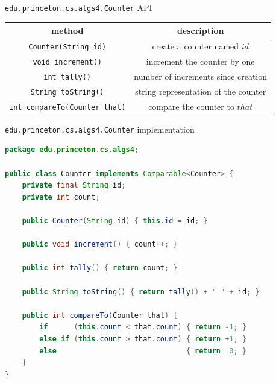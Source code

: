 \documentclass[8pt,a4paper,compress]{beamer}
\begin{document}
\begin{frame}[fragile]
\pause

\lstinline{edu.princeton.cs.algs4.Counter} API
\begin{center}
\begin{tabular}{cc}
method & description \\ \hline
\lstinline$Counter(String id)$ & create a counter named $id$ \\
\lstinline$void increment()$ & increment the counter by one \\
\lstinline$int tally()$ & number of increments since creation \\
\lstinline$String toString()$ & string representation of the counter \\
\lstinline$int compareTo(Counter that)$ & compare the counter to $that$
\end{tabular} 
\end{center}

\pause

\lstinline{edu.princeton.cs.algs4.Counter} implementation

\smallskip

\begin{lstlisting}[language=Java,style=focusin]
package edu.princeton.cs.algs4;

public class Counter implements Comparable<Counter> {
    private final String id;
    private int count;

    public Counter(String id) { this.id = id; }

    public void increment() { count++; }

    public int tally() { return count; }

    public String toString() { return tally() + " " + id; }
    
    public int compareTo(Counter that) {
        if      (this.count < that.count) { return -1; }
        else if (this.count > that.count) { return +1; }
        else                              { return  0; }
    }
}
\end{lstlisting}
\end{frame}
\end{document}
